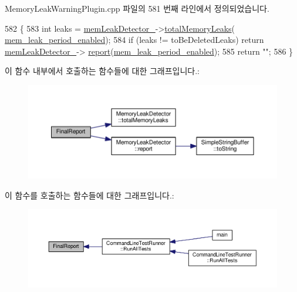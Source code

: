 Memory\+Leak\+Warning\+Plugin.\+cpp 파일의 581 번째 라인에서 정의되었습니다.


\begin{DoxyCode}
582 \{
583     \textcolor{keywordtype}{int} leaks = \hyperlink{class_memory_leak_warning_plugin_afe143d17de3accfcf9be8c7d476e26fa}{memLeakDetector\_}->\hyperlink{class_memory_leak_detector_a7b0c5d9c4d678d6e0081802416660803}{totalMemoryLeaks}(
      \hyperlink{_memory_leak_detector_8h_ab248e6cc6c6699b88b002286d8a3ed76af44afdfdc843b0c299b8b0a9585a0f32}{mem\_leak\_period\_enabled});
584     \textcolor{keywordflow}{if} (leaks != toBeDeletedLeaks) \textcolor{keywordflow}{return} \hyperlink{class_memory_leak_warning_plugin_afe143d17de3accfcf9be8c7d476e26fa}{memLeakDetector\_}->
      \hyperlink{class_memory_leak_detector_acc70330c27080c4b09b96342929dc9ca}{report}(\hyperlink{_memory_leak_detector_8h_ab248e6cc6c6699b88b002286d8a3ed76af44afdfdc843b0c299b8b0a9585a0f32}{mem\_leak\_period\_enabled});
585     \textcolor{keywordflow}{return} \textcolor{stringliteral}{""};
586 \}
\end{DoxyCode}


이 함수 내부에서 호출하는 함수들에 대한 그래프입니다.\+:
\nopagebreak
\begin{figure}[H]
\begin{center}
\leavevmode
\includegraphics[width=350pt]{class_memory_leak_warning_plugin_a421735183ea6221a87c52f9899ec7fe2_cgraph}
\end{center}
\end{figure}




이 함수를 호출하는 함수들에 대한 그래프입니다.\+:
\nopagebreak
\begin{figure}[H]
\begin{center}
\leavevmode
\includegraphics[width=350pt]{class_memory_leak_warning_plugin_a421735183ea6221a87c52f9899ec7fe2_icgraph}
\end{center}
\end{figure}


